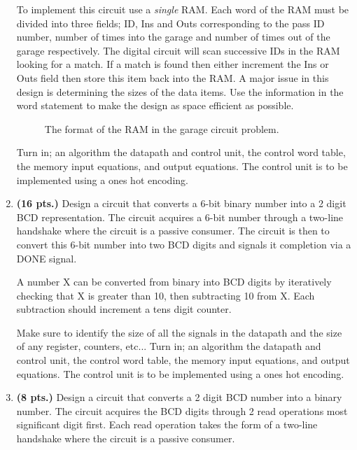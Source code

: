 \begin{enumerate}
        To implement this circuit use a \textit{ single} RAM.  Each word of the
        RAM must be divided into three fields; ID, Ins and Outs corresponding to
        the pass ID number, number of times into the garage and number of times
        out of the garage respectively.   The digital circuit will scan successive
        IDs in the RAM looking for a match.  If a match
        is found then either increment the Ins or Outs field then store this
        item back into the RAM.  A major issue in this design is determining
        the sizes of the data items.  Use the information in the word statement
        to make the design as space efficient as possible.
        \begin{figure}[ht]
            \caption{The format of the RAM in the garage circuit problem.}
            \label{fig:GarRAM}
        \end{figure}
        Turn in; an algorithm the datapath and control unit, the control word
        table, the memory input equations, and output equations.
        The control unit is to be implemented using a ones hot encoding.

    \item \textbf{ (16 pts.)} Design a circuit that converts a 6-bit binary number into a 2
        digit BCD representation.  The circuit acquires a 6-bit number through
        a two-line handshake where the circuit is a passive consumer.  The
        circuit is then to convert this 6-bit number into two BCD digits and
        signals it completion via a DONE signal.

        A number X can be converted from binary into BCD digits by iteratively
        checking that X is greater than 10, then subtracting 10 from X.  Each
        subtraction should increment a tens digit counter.

        Make sure to identify the size of all the signals in the datapath
        and the size of any register, counters, etc...
        Turn in; an algorithm the datapath and control unit, the control word
        table, the memory input equations, and output equations.
        The control unit is to be implemented using a ones hot encoding.

    \item \textbf{ (8 pts.)}
        Design a circuit that converts a 2 digit BCD number into a
        binary number.  The circuit acquires the BCD digits through 2 read
        operations most significant digit first.  Each read operation takes
        the form of a two-line handshake where the circuit is a passive
        consumer.


\end{enumerate}
